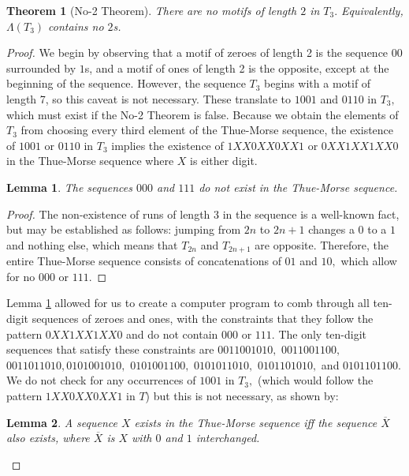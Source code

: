 \documentclass{article}
\newtheorem{theorem}{Theorem}[section]
\newtheorem{lemma}{Lemma}[section]
\begin{document}
\begin{theorem}[No-2 Theorem]
\label{no2}
There are no motifs of length $2$ in $T_3.$ Equivalently, $\Lambda(T_3)$ contains no $2$s.
\end{theorem}

\begin{proof}
We begin by observing that a motif of zeroes of length 2 is the sequence $00$ surrounded by $1$s, and a motif of ones of length 2 is the opposite, except at the beginning of the sequence. However, the sequence $T_3$ begins with a motif of length 7, so this caveat is not necessary. These translate to $1001$ and $0110$ in $T_3,$ which must exist if the No-2 Theorem is false. Because we obtain the elements of $T_3$ from choosing every third element of the Thue-Morse sequence, the existence of $1001$ or $0110$ in $T_3$ implies the existence of $1XX0XX0XX1$ or $0XX1XX1XX0$ in the Thue-Morse sequence where $X$ is either digit.

\begin{lemma}
\label{triplet}
The sequences $000$ and $111$ do not exist in the Thue-Morse sequence.
\end{lemma}

\begin{proof} The non-existence of runs of length 3 in the sequence is a well-known fact, but may be established as follows: jumping from $2n$ to $2n+1$ changes a $0$ to a $1$ and nothing else, which means that $T_{2n}$ and $T_{2n+1}$ are opposite. Therefore, the entire Thue-Morse sequence consists of concatenations of $01$ and $10,$ which allow for no $000$ or $111.$
\end{proof}

Lemma \ref{triplet} allowed for us to create a computer program to comb through all ten-digit sequences of zeroes and ones, with the constraints that they follow the pattern $0XX1XX1XX0$ and do not contain $000$ or $111.$  The only ten-digit sequences that satisfy these constraints are $0011001010,$ $0011001100,$ $0011011010,$$0101001010,$ $0101001100,$ $0101011010,$ $0101101010,$ and $0101101100.$ We do not check for any occurrences of $1001$ in $T_3,$ (which would follow the pattern $1XX0XX0XX1$ in $T$) but this is not necessary, as shown by:

\begin{lemma}
\label{xiffxbar}
A sequence $X$ exists in the Thue-Morse sequence \emph{iff} the sequence $\overline{X}$ also exists, where $\overline{X}$ is $X$ with $0$ and $1$ interchanged.
\end{lemma}


\end{proof}
\end{document}
